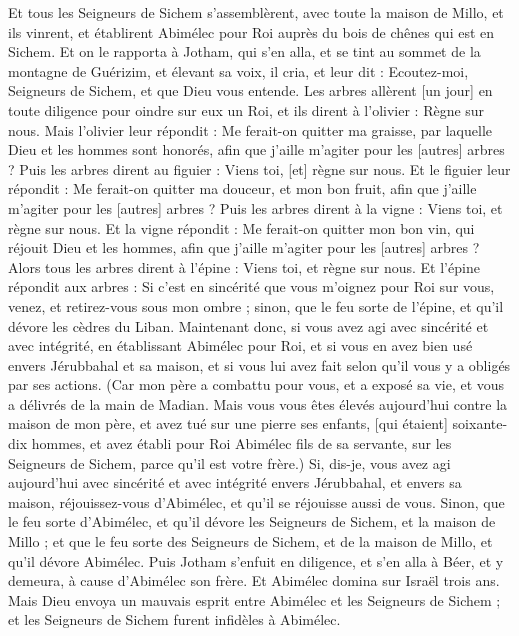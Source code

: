 \begin{multicols}{2}
Et tous les Seigneurs de Sichem s'assemblèrent, avec toute la maison de Millo, et ils vinrent, et établirent Abimélec pour Roi auprès du bois de chênes qui est en Sichem.
Et on le rapporta à Jotham, qui s'en alla, et se tint au sommet de la montagne de Guérizim, et élevant sa voix, il cria, et leur dit : Ecoutez-moi, Seigneurs de Sichem, et que Dieu vous entende.
Les arbres allèrent [un jour] en toute diligence pour oindre sur eux un Roi, et ils dirent à l'olivier : Règne sur nous.
Mais l'olivier leur répondit : Me ferait-on quitter ma graisse, par laquelle Dieu et les hommes sont honorés, afin que j'aille m'agiter pour les [autres] arbres ?
Puis les arbres dirent au figuier : Viens toi, [et] règne sur nous.
Et le figuier leur répondit : Me ferait-on quitter ma douceur, et mon bon fruit, afin que j'aille m'agiter pour les [autres] arbres ?
Puis les arbres dirent à la vigne : Viens toi, et règne sur nous.
Et la vigne répondit : Me ferait-on quitter mon bon vin, qui réjouit Dieu et les hommes, afin que j'aille m'agiter pour les [autres] arbres ?
Alors tous les arbres dirent à l'épine : Viens toi, et règne sur nous.
Et l'épine répondit aux arbres : Si c'est en sincérité que vous m'oignez pour Roi sur vous, venez, et retirez-vous sous mon ombre ; sinon, que le feu sorte de l'épine, et qu'il dévore les cèdres du Liban.
Maintenant donc, si vous avez agi avec sincérité et avec intégrité, en établissant Abimélec pour Roi, et si vous en avez bien usé envers Jérubbahal et sa maison, et si vous lui avez fait selon qu'il vous y a obligés par ses actions.
(Car mon père a combattu pour vous, et a exposé sa vie, et vous a délivrés de la main de Madian.
Mais vous vous êtes élevés aujourd'hui contre la maison de mon père, et avez tué sur une pierre ses enfants, [qui étaient] soixante-dix hommes, et avez établi pour Roi Abimélec fils de sa servante, sur les Seigneurs de Sichem, parce qu'il est votre frère.)
Si, dis-je, vous avez agi aujourd'hui avec sincérité et avec intégrité envers Jérubbahal, et envers sa maison, réjouissez-vous d'Abimélec, et qu'il se réjouisse aussi de vous.
Sinon, que le feu sorte d'Abimélec, et qu'il dévore les Seigneurs de Sichem, et la maison de Millo ; et que le feu sorte des Seigneurs de Sichem, et de la maison de Millo, et qu'il dévore Abimélec.
Puis Jotham s'enfuit en diligence, et s'en alla à Béer, et y demeura, à cause d'Abimélec son frère.
Et Abimélec domina sur Israël trois ans.
Mais Dieu envoya un mauvais esprit entre Abimélec et les Seigneurs de Sichem ; et les Seigneurs de Sichem furent infidèles à Abimélec.

\end{multicols}
